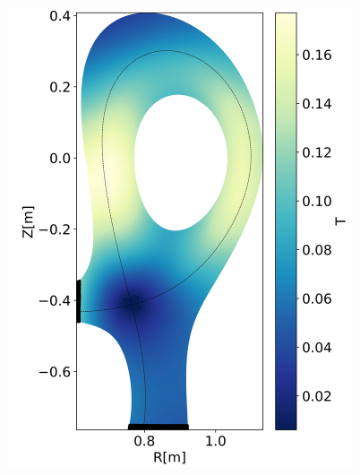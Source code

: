 \begin{figure}[H]\centering
	\begin{subfigure}[t]{0.3\textwidth}
		\centering
		\includegraphics[width=1\textwidth]{schemes/Hmode_Bpol_eq.jpg}
		\label{fig:TCV_poloidalFieldGS_Beq}
	\end{subfigure}
	\begin{subfigure}[t]{0.3\textwidth}
		\centering

\end{subfigure}
\end{figure}

